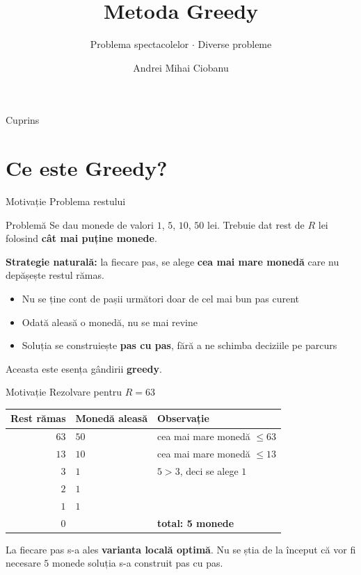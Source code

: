 \documentclass{beamer}
\title{Metoda Greedy}
\subtitle{Problema spectacolelor $\cdot$ Diverse probleme}
\author{Andrei Mihai Ciobanu}
\institute{Algolymp Summer School}
\date{}
\begin{document}
\begin{frame}
  \titlepage
\end{frame}

\begin{frame}{Cuprins}
  \tableofcontents[hideallsubsections]
\end{frame}

\section{Ce este Greedy?}

\begin{frame}{Motivație \textemdash{} Problema restului}
  \begin{block}{Problemă}
    Se dau monede de valori $1$, $5$, $10$, $50$ lei.
    Trebuie dat rest de $R$ lei folosind \textbf{cât mai puține monede}.
  \end{block}
  \smallskip
  \textbf{Strategie naturală:} la fiecare pas, se alege
  \textbf{cea mai mare monedă} care nu depășește restul rămas.
  \smallskip
  \begin{itemize}
    \item Nu se ține cont de pașii următori \textemdash{} doar de cel mai bun pas curent
    \item Odată aleasă o monedă, nu se mai revine
    \item Soluția se construiește \textbf{pas cu pas}, fără a ne schimba deciziile pe parcurs
  \end{itemize}
  \smallskip
  Aceasta este esența gândirii \textbf{greedy}.
\end{frame}

\begin{frame}{Motivație \textemdash{} Rezolvare pentru $R = 63$}
  \begin{center}
  \begin{tabular}{rll}
    \toprule
    Rest rămas & Monedă aleasă & Observație \\
    \midrule
    $63$ & $50$ & cea mai mare monedă $\leq 63$ \\
    $13$ & $10$ & cea mai mare monedă $\leq 13$ \\
    $3$  & $1$  & $5 > 3$, deci se alege $1$ \\
    $2$  & $1$  & \\
    $1$  & $1$  & \\
    \midrule
    $0$  & \textemdash{} & \textbf{total: 5 monede} \\
    \bottomrule
  \end{tabular}
  \end{center}
  \smallskip
  La fiecare pas s-a ales \textbf{varianta locală optimă}.
  Nu se știa de la început că vor fi necesare $5$ monede \textemdash{}
  soluția s-a construit pas cu pas.
\end{frame}
\end{document}
